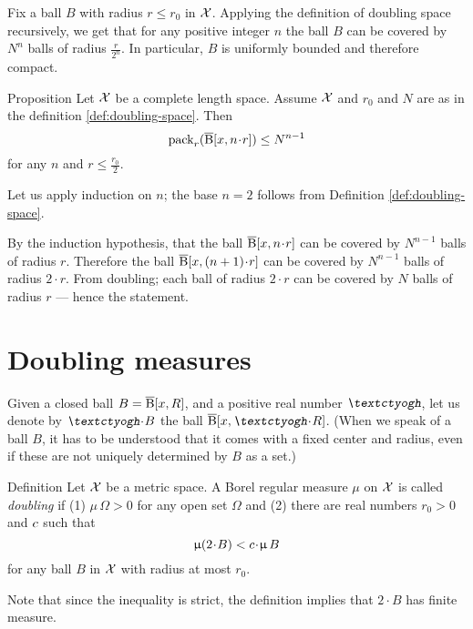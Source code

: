 Fix a ball $B$ with radius $r\le r_0$ in $\mathcal{X}$.
Applying the definition of doubling space recursively,
we get that for any positive integer $n$ 
the ball $B$ can be covered by $N^n$ balls of radius $\tfrac{r}{2^n}$.
In particular, $B$ is uniformly bounded 
and therefore compact.
\qeds

\begin{thm}{Proposition}\label{prop:2ble=>global}
Let $\mathcal{X}$ be a complete length space.
Assume $\mathcal{X}$ and $r_0$ and $N$ are as in the definition \ref{def:doubling-space}.
Then 
\[
\pack_{r}(\cBall[x,n\cdot r])\le N^{n-1}\]
for any $n$ and $r\le \frac{r_0}2$.
\end{thm}


Let us apply induction on $n$; the base $n=2$ follows from Definition \ref{def:doubling-space}.

By the induction hypothesis, that the ball $\cBall[x,n\cdot r]$ can be covered by $N^{n-1}$ balls of radius $r$.
Therefore the ball $\cBall[x,(n+1)\cdot r]$ can be covered by $N^{n-1}$ balls of radius $2\cdot r$.
From doubling; each ball of radius $2\cdot r$ can be covered by $N$ balls of radius $r$ --- hence the statement.
\qeds

\section{Doubling measures}\label{sec:doubling-mes}

Given a closed ball $B=\overline{\mathrm{B}}{}[x,R]$,
and a positive real number $\lam$,
let us denote by $\lam \cdot B$ the ball $\cBall[x,\lam\cdot R]$.
(When we speak of a ball $B$, 
it has to be understood that it comes with a fixed center and radius, 
even if these are not uniquely determined by $B$ as a set.)



\begin{thm}{Definition}\label{def:doubling-measure}
Let $\mathcal{X}$ be a metric space. 
A Borel regular measure $\mu$ on $\mathcal{X}$ is called 
\emph{doubling} 
if 
(1) $\mu\,\Omega>0$ for any open set $\Omega$ 
and
(2) there are real numbers $r_0>0$ and $c$ such that
\[\mu (2\cdot B)
<
\Const\cdot \mu\, B\]
for any ball $B$ in $\mathcal{X}$ with radius at most $r_0$.
\end{thm}

Note that since the inequality is strict, the definition implies that $2\cdot B$ has finite measure.


